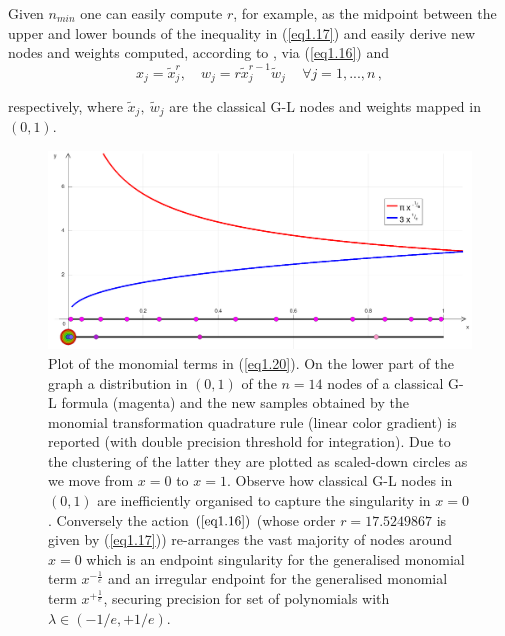 \documentclass[a4paper, twosided]{book}
\begin{document}
\noindent
Given $n_{min}$ one can easily compute $r$, for example, as the midpoint between the upper and lower bounds of the inequality in (\ref{eq1.17}) and easily derive new nodes and weights computed, according to \cite{Lombardi09,Lombardi21}, via (\ref{eq1.16}) and 
\begin{equation}\label{eq1.19}
    x_j=\tilde{x}_j^{r},\quad w_j = r\tilde{x}_j^{r-1}\tilde{w}_j\,\quad\forall j=1,...,n\,,
\end{equation}

\noindent
respectively, where $\tilde{x}_j,\:\tilde{w}_j$ are the classical G-L nodes and weights mapped in $(0,1)$.

\begin{center}
        \begin{figure}[h]
        \captionsetup{singlelinecheck=off}
        \includegraphics[keepaspectratio,width=\textwidth]{images/Fig1_2.png}
        \caption{Plot of the monomial terms in (\ref{eq1.20}). On the lower part of the graph a distribution in $(0,1)$ of the $n=14$ nodes of a classical G-L formula (magenta) and the new samples obtained by the monomial transformation quadrature rule (linear color gradient) is reported (with double precision threshold for integration). Due to the clustering of the latter they are plotted as scaled-down circles as we move from $x=0$ to $x=1$. Observe how classical G-L nodes in $(0,1)$ are inefficiently organised to capture the singularity in $x=0$. Conversely the action $(\ref{eq1.16})$ (whose order $r=17.5249867$ is given by (\ref{eq1.17})) re-arranges the vast majority of nodes around $x=0$ which is an endpoint singularity for the generalised monomial term $x^{-\frac{1}{e}}$
        and an irregular endpoint for the generalised monomial term $x^{+\frac{1}{e}}$, securing precision for set of polynomials with $\lambda\in (-1/e, + 1/e)$.}
        \label{Fig1.2}
        \end{figure}
\end{center}
\end{document}
